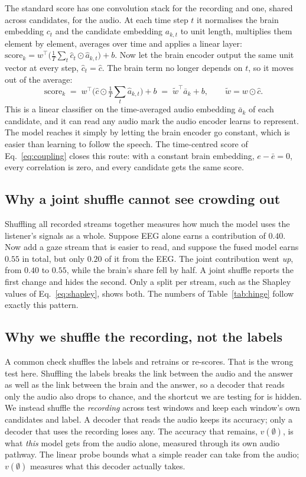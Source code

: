 The standard score has one convolution stack for the recording and one, shared
across candidates, for the audio. At each time step $t$ it normalises the brain
embedding $c_t$ and the candidate embedding $a_{k,t}$ to unit length, multiplies
them element by element, averages over time and applies a linear layer:
$\mathrm{score}_k = w^\top\big(\frac1T\sum_t \hat c_t\odot\hat a_{k,t}\big)+b$.
Now let the brain encoder output the same unit vector at every step,
$\hat c_t=\hat c$. The brain term no longer depends on $t$, so it moves out of the
average:
\begin{equation}
  \mathrm{score}_k \;=\; w^\top\!\Big(\hat c \odot \tfrac1T\textstyle\sum_t \hat a_{k,t}\Big) + b
  \;=\; \tilde w^\top \bar a_k + b,\qquad \tilde w=w\odot\hat c .
\end{equation}
This is a linear classifier on the time-averaged audio embedding $\bar a_k$ of
each candidate, and it can read any audio mark the audio encoder learns to
represent. The model reaches it simply by letting the brain encoder go constant,
which is easier than learning to follow the speech. The time-centred score of
Eq.~\ref{eq:coupling} closes this route: with a constant brain embedding,
$e-\bar e=0$, every correlation is zero, and every candidate gets the same score.

\subsection{Why a joint shuffle cannot see crowding out}
\label{app:freeload}

Shuffling all recorded streams together measures how much the model uses the
listener's signals as a whole. Suppose EEG alone earns a contribution of $0.40$.
Now add a gaze stream that is easier to read, and suppose the fused model earns
$0.55$ in total, but only $0.20$ of it from the EEG. The joint contribution went
\emph{up}, from $0.40$ to $0.55$, while the brain's share fell by half. A joint
shuffle reports the first change and hides the second. Only a split per stream,
such as the Shapley values of Eq.~\ref{eq:shapley}, shows both. The numbers of
Table~\ref{tab:hinge} follow exactly this pattern.

\subsection{Why we shuffle the recording, not the labels}
\label{app:perm}

A common check shuffles the labels and retrains or re-scores. That is the wrong
test here. Shuffling the labels breaks the link between the audio and the answer
as well as the link between the brain and the answer, so a decoder that reads
only the audio also drops to chance, and the shortcut we are testing for is
hidden. We instead shuffle the \emph{recording} across test windows and keep each
window's own candidates and label. A decoder that reads the audio keeps its
accuracy; only a decoder that uses the recording loses any. The accuracy that
remains, $v(\emptyset)$, is what \emph{this} model gets from the audio alone,
measured through its own audio pathway. The linear probe bounds what a simple
reader can take from the audio; $v(\emptyset)$ measures what this decoder
actually takes.
